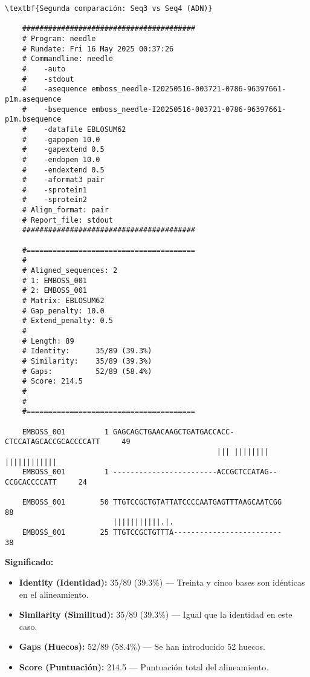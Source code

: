 \documentclass[fleqn,10pt]{article}
\begin{document}
    \begin{lstlisting}[style=outputstyle, basicstyle=\ttfamily\footnotesize]
    \textbf{Segunda comparación: Seq3 vs Seq4 (ADN)}

    ########################################
    # Program: needle
    # Rundate: Fri 16 May 2025 00:37:26
    # Commandline: needle
    #    -auto
    #    -stdout
    #    -asequence emboss_needle-I20250516-003721-0786-96397661-p1m.asequence
    #    -bsequence emboss_needle-I20250516-003721-0786-96397661-p1m.bsequence
    #    -datafile EBLOSUM62
    #    -gapopen 10.0
    #    -gapextend 0.5
    #    -endopen 10.0
    #    -endextend 0.5
    #    -aformat3 pair
    #    -sprotein1
    #    -sprotein2
    # Align_format: pair
    # Report_file: stdout
    ########################################

    #=======================================
    #
    # Aligned_sequences: 2
    # 1: EMBOSS_001
    # 2: EMBOSS_001
    # Matrix: EBLOSUM62
    # Gap_penalty: 10.0
    # Extend_penalty: 0.5
    #
    # Length: 89
    # Identity:      35/89 (39.3%)
    # Similarity:    35/89 (39.3%)
    # Gaps:          52/89 (58.4%)
    # Score: 214.5
    # 
    #
    #=======================================

    EMBOSS_001         1 GAGCAGCTGAACAAGCTGATGACCACC-CTCCATAGCACCGCACCCCATT     49
                                                 ||| ||||||||  ||||||||||||
    EMBOSS_001         1 ------------------------ACCGCTCCATAG--CCGCACCCCATT     24

    EMBOSS_001        50 TTGTCCGCTGTATTATCCCCAATGAGTTTAAGCAATCGG     88
                         |||||||||||.|.                         
    EMBOSS_001        25 TTGTCCGCTGTTTA-------------------------     38

    \end{lstlisting}
    \textbf{Significado:}  
    \begin{itemize}
        \item \textbf{Identity (Identidad):} 35/89 (39.3\%) --- Treinta y cinco bases son idénticas en el alineamiento.
        \item \textbf{Similarity (Similitud):} 35/89 (39.3\%) --- Igual que la identidad en este caso.
        \item \textbf{Gaps (Huecos):} 52/89 (58.4\%) --- Se han introducido 52 huecos.
        \item \textbf{Score (Puntuación):} 214.5 --- Puntuación total del alineamiento.
    \end{itemize}
\end{document}

